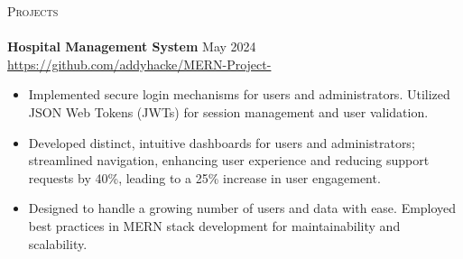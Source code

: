 \documentclass[a4paper]{article}
\newcommand{\lineunder} {
    \vspace*{-8pt} \\
    \hspace*{-18pt} \hrulefill \\
}
\newcommand{\header} [1] {
    {\hspace*{-18pt}\vspace*{6pt} \textsc{#1}}
    \vspace*{-6pt} \lineunder
}
\begin{document}
\vspace{-4mm}


\header{Projects}

{\textbf{Hospital Management System}} \hfill May 2024 \\
\vspace{-1mm}
\url{https://github.com/addyhacke/MERN-Project-} \\
\vspace{-2mm}
\begin{itemize} 
	\item Implemented secure login mechanisms for users and administrators.
Utilized JSON Web Tokens (JWTs) for session management and user validation.
    \item Developed distinct, intuitive dashboards for users and administrators; streamlined navigation, enhancing user experience and reducing support requests by 40\%, leading to a 25\% increase in user engagement.
    \item Designed to handle a growing number of users and data with ease.
Employed best practices in MERN stack development for maintainability and scalability.
\end{itemize}
\end{document}
